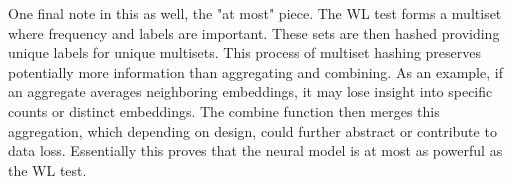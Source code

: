\documentclass{article}
\numberwithin{figure}{section}
\begin{document}
{One final note in this as well, the "at most" piece. The WL test forms a multiset where frequency and labels are important. These sets are then hashed providing unique labels for unique multisets. This process of multiset hashing preserves potentially more information than aggregating and combining. As an example, if an aggregate averages neighboring embeddings, it may lose insight into specific counts or distinct embeddings. The combine function then merges this aggregation, which depending on design, could further abstract or contribute to data loss. Essentially this proves that the neural model is at most as powerful as the WL test.}
\end{document}
